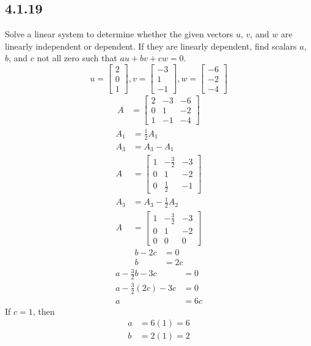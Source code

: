 \documentclass{article}
\begin{document}
\subsection{4.1.19}
Solve a linear system to determine whether the given vectors $ u $, $ v $, and $ w $ are linearly independent or dependent. If they are linearly dependent, find scalars $ a $, $ b $, and $ c $ not all zero such that $ au + bv + cw = 0 $.
\begin{equation*}
	u = \begin{bmatrix} 2 \\ 0 \\ 1 \end{bmatrix},
	v = \begin{bmatrix} -3 \\ 1 \\ -1 \end{bmatrix},
	w = \begin{bmatrix} -6 \\ -2 \\ -4 \end{bmatrix}
\end{equation*}
\begin{align*}
	A & = \begin{bmatrix}
		2 & -3 & -6 \\
		0 & 1 & -2 \\
		1 & -1 & -4
	\end{bmatrix}
\end{align*}
\begin{align*}
	A_1 & = \frac{1}{2}A_1 \\
	A_3 & = A_3 - A_1 \\
	A & = \begin{bmatrix}
		1 & -\frac{3}{2} & -3 \\
		0 & 1 & -2 \\
		0 & \frac{1}{2} & -1
	\end{bmatrix}
\end{align*}
\begin{align*}
	A_3 & = A_3 - \frac{1}{2}A_2 \\
	A & = \begin{bmatrix}
		1 & -\frac{3}{2} & -3 \\
		0 & 1 & -2 \\
		0 & 0 & 0
	\end{bmatrix}
\end{align*}
\begin{align*}
	b - 2c & = 0 \\
	b & = 2c
\end{align*}
\begin{align*}
	a - \frac{3}{2}b - 3c & = 0 \\
	a - \frac{3}{2}(2c) - 3c & = 0 \\
	a & = 6c
\end{align*}
If $ c = 1 $, then
\begin{align*}
	a & = 6(1) = 6 \\
	b & = 2(1) = 2
\end{align*}
\end{document}
